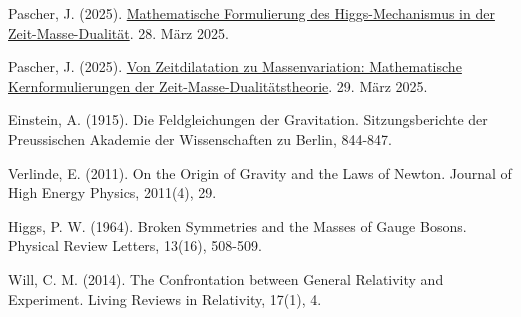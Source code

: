 \documentclass[12pt,a4paper]{article}
\begin{document}
\begin{thebibliography}{9}
	 Pascher, J. (2025). \href{https://github.com/jpascher/T0-Time-Mass-Duality/tree/main/2/pdf/Deutsch/Mathematische Formulierung des Higgs-Mechanismus in der Zeit-Masse-Dualität.pdf}{Mathematische Formulierung des Higgs-Mechanismus in der Zeit-Masse-Dualität}. 28. März 2025.
	
	 Pascher, J. (2025). \href{https://github.com/jpascher/T0-Time-Mass-Duality/tree/main/2/pdf/Deutsch/Mathematische Formulierungen der Zeit-Masse-Dualitätstheorie mit Lagrange.pdf}{Von Zeitdilatation zu Massenvariation: Mathematische Kernformulierungen der Zeit-Masse-Dualitätstheorie}. 29. März 2025.
	
	 Einstein, A. (1915). Die Feldgleichungen der Gravitation. Sitzungsberichte der Preussischen Akademie der Wissenschaften zu Berlin, 844-847.
	
	 Verlinde, E. (2011). On the Origin of Gravity and the Laws of Newton. Journal of High Energy Physics, 2011(4), 29.
	
	 Higgs, P. W. (1964). Broken Symmetries and the Masses of Gauge Bosons. Physical Review Letters, 13(16), 508-509.
	
	 Will, C. M. (2014). The Confrontation between General Relativity and Experiment. Living Reviews in Relativity, 17(1), 4.
\end{thebibliography}
	
\end{document}
